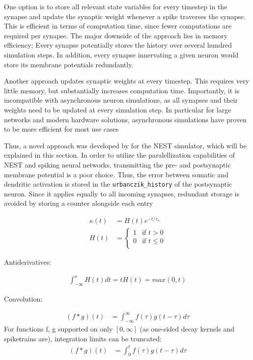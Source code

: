 One option is to store all relevant state variables for every timestep in the synapse and update the synaptic weight whenever
a spike traverses the synapse. This is efficient in terms of computation time, since fewer computations are required
per synapse. The major downside of the approach lies in memory efficiency; Every synapse potentially stores the history
over several hundred simulation steps. In addition, every synapse innervating a given neuron would store its membrane
potentials redundantly.

Another approach updates synaptic weights at every timestep. This requires very little memory, but substantially increases
computation time. Importantly, it is incompatible with asynchronous neuron simulations, as all synapses and their weights
need to be updated at every simulation step. In particular for large networks and modern hardware solutions, asynchronous
simulations have proven to be more efficient for most use cases 

Thus, a novel approach was developed by \cite{Stapmanns2021} for the NEST simulator, which will be explained in this
section. In order to utilize the paralellization capabilities of NEST and spiking neural networks, transmitting
the pre- and postsynaptic membrane potential is a poor choice. Thus, the error between somatic and dendritic activation
is stored in the \texttt{urbanczik\_history} of the postsynaptic neuron. Since it applies equally to all incoming
synapses, redundant storage is avoided by storing a counter alongside each entry



\begin{align}
  \kappa(t) & = H(t)e^{-t/\tau_{\kappa}} \\
  H(t)      & =
  \begin{cases}
    1 & \text{if $t > 0$}    \\
    0 & \text{if $t \leq 0$} \\
  \end{cases}
\end{align}

Antiderivatives:

\begin{align}
  \int_{-\infty}^x H(t)dt = tH(t) = max(0,t)
\end{align}

Convolution:

\begin{align}
  (f \ast g)(t) & = \int_{- \infty }^{\infty} f(\tau) g(t-\tau) d \tau
\end{align}
For functions f, g supported on only $[0, \infty]$ (as one-sided decay kernels and spiketrains are), integration limits can be truncated:
\begin{align}
  (f \ast g)(t) & = \int_{0}^{t} f(\tau) g(t-\tau) d \tau \\
\end{align}


